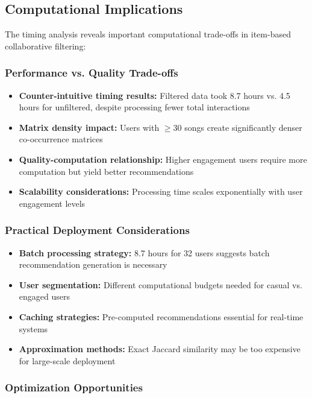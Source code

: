 \documentclass[12pt,a4paper]{article}
\begin{document}
\subsection{Computational Implications}

The timing analysis reveals important computational trade-offs in item-based collaborative filtering:

\subsubsection{Performance vs. Quality Trade-offs}

\begin{itemize}
    \item \textbf{Counter-intuitive timing results:} Filtered data took 8.7 hours vs. 4.5 hours for unfiltered, despite processing fewer total interactions
    \item \textbf{Matrix density impact:} Users with $\geq$30 songs create significantly denser co-occurrence matrices
    \item \textbf{Quality-computation relationship:} Higher engagement users require more computation but yield better recommendations
    \item \textbf{Scalability considerations:} Processing time scales exponentially with user engagement levels
\end{itemize}

\subsubsection{Practical Deployment Considerations}

\begin{itemize}
    \item \textbf{Batch processing strategy:} 8.7 hours for 32 users suggests batch recommendation generation is necessary
    \item \textbf{User segmentation:} Different computational budgets needed for casual vs. engaged users
    \item \textbf{Caching strategies:} Pre-computed recommendations essential for real-time systems
    \item \textbf{Approximation methods:} Exact Jaccard similarity may be too expensive for large-scale deployment
\end{itemize}

\subsubsection{Optimization Opportunities}
\end{document}
